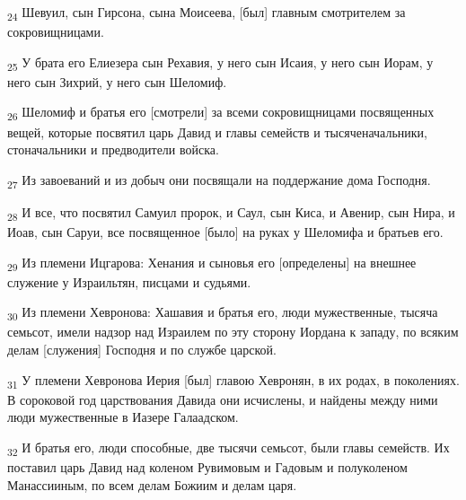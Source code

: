 \begin{tcolorbox}
\textsubscript{24} Шевуил, сын Гирсона, сына Моисеева, [был] главным смотрителем за сокровищницами.
\end{tcolorbox}
\begin{tcolorbox}
\textsubscript{25} У брата его Елиезера сын Рехавия, у него сын Исаия, у него сын Иорам, у него сын Зихрий, у него сын Шеломиф.
\end{tcolorbox}
\begin{tcolorbox}
\textsubscript{26} Шеломиф и братья его [смотрели] за всеми сокровищницами посвященных вещей, которые посвятил царь Давид и главы семейств и тысяченачальники, стоначальники и предводители войска.
\end{tcolorbox}
\begin{tcolorbox}
\textsubscript{27} Из завоеваний и из добыч они посвящали на поддержание дома Господня.
\end{tcolorbox}
\begin{tcolorbox}
\textsubscript{28} И все, что посвятил Самуил пророк, и Саул, сын Киса, и Авенир, сын Нира, и Иоав, сын Саруи, все посвященное [было] на руках у Шеломифа и братьев его.
\end{tcolorbox}
\begin{tcolorbox}
\textsubscript{29} Из племени Ицгарова: Хенания и сыновья его [определены] на внешнее служение у Израильтян, писцами и судьями.
\end{tcolorbox}
\begin{tcolorbox}
\textsubscript{30} Из племени Хевронова: Хашавия и братья его, люди мужественные, тысяча семьсот, имели надзор над Израилем по эту сторону Иордана к западу, по всяким делам [служения] Господня и по службе царской.
\end{tcolorbox}
\begin{tcolorbox}
\textsubscript{31} У племени Хевронова Иерия [был] главою Хевронян, в их родах, в поколениях. В сороковой год царствования Давида они исчислены, и найдены между ними люди мужественные в Иазере Галаадском.
\end{tcolorbox}
\begin{tcolorbox}
\textsubscript{32} И братья его, люди способные, две тысячи семьсот, были главы семейств. Их поставил царь Давид над коленом Рувимовым и Гадовым и полуколеном Манассииным, по всем делам Божиим и делам царя.
\end{tcolorbox}
